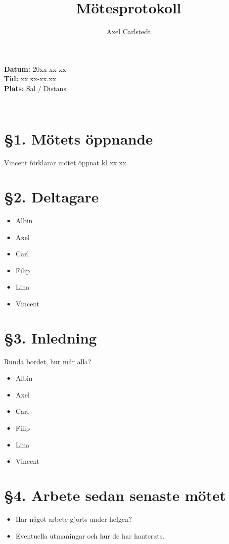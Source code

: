\documentclass[a4paper, 11pt]{article}
\title{Mötesprotokoll}
\author{Axel Carlstedt}
\begin{document}
\pagestyle{style1}


\textbf{Datum:} 20xx-xx-xx\\
\textbf{Tid:} xx.xx-xx.xx\\
\textbf{Plats:} Sal / Distans

\makebox[\linewidth]{\rule{\linewidth}{0.4pt}}\\

\section*{§1. Mötets öppnande}
Vincent förklarar mötet öppnat kl xx.xx.

\section*{§2. Deltagare}
\begin{itemize}
    \item Albin
    \item Axel
    \item Carl
    \item Filip
    \item Lina
    \item Vincent
\end{itemize}


\section*{§3. Inledning}
Runda bordet, hur mår alla?
\begin{itemize}
    \item Albin
    \item Axel
    \item Carl
    \item Filip
    \item Lina
    \item Vincent
\end{itemize}


\section*{§4. Arbete sedan senaste mötet}
\begin{itemize}
    \item Har något arbete gjorts under helgen?\\
    \item Eventuella utmaningar och hur de har hanterats.\\
\end{itemize}
\end{document}
